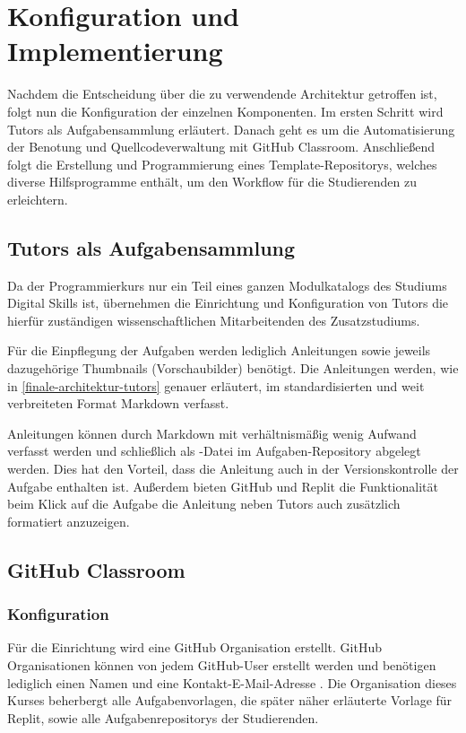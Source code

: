 \section{Konfiguration und Implementierung}\label{konfiguration-u-impl}
Nachdem die Entscheidung über die zu verwendende Architektur getroffen ist,
folgt nun die Konfiguration der einzelnen Komponenten. Im ersten Schritt wird
Tutors als Aufgabensammlung erläutert. Danach geht es um die Automatisierung der
Benotung und Quellcodeverwaltung mit GitHub Classroom. Anschließend folgt die
Erstellung und Programmierung eines Template-Repositorys, welches diverse
Hilfsprogramme enthält, um den Workflow für die Studierenden zu erleichtern.

\subsection{Tutors als Aufgabensammlung}\label{tutors-als-aufgabensammlung}
Da der Programmierkurs nur ein Teil eines ganzen Modulkatalogs des Studiums
Digital Skills ist, übernehmen die Einrichtung und Konfiguration von Tutors die
hierfür zuständigen wissenschaftlichen Mitarbeitenden des Zusatzstudiums.

Für die Einpflegung der Aufgaben werden lediglich Anleitungen sowie
jeweils dazugehörige Thumbnails (Vorschaubilder) benötigt. Die Anleitungen
werden, wie in \autoref{finale-architektur-tutors} genauer erläutert, im
standardisierten und weit verbreiteten Format Markdown verfasst.

Anleitungen können durch Markdown mit verhältnismäßig wenig Aufwand verfasst
werden und schließlich als -Datei im Aufgaben-Repository
abgelegt werden. Dies hat den Vorteil, dass die Anleitung auch in der
Versionskontrolle der Aufgabe enthalten ist. Außerdem bieten GitHub und Replit
die Funktionalität beim Klick auf die Aufgabe die Anleitung neben Tutors auch
zusätzlich formatiert anzuzeigen.

\subsection{GitHub Classroom}\label{github-classroom}
\subsubsection{Konfiguration}\label{classroom-konfiguration}
Für die Einrichtung wird eine GitHub Organisation erstellt. GitHub
Organisationen können von jedem GitHub-User erstellt werden und benötigen
lediglich einen Namen und eine Kontakt-E-Mail-Adresse
\parencite{github-organisation-erstellen}. Die Organisation dieses Kurses
beherbergt alle Aufgabenvorlagen, die später näher erläuterte Vorlage für
Replit, sowie alle Aufgabenrepositorys der Studierenden.

